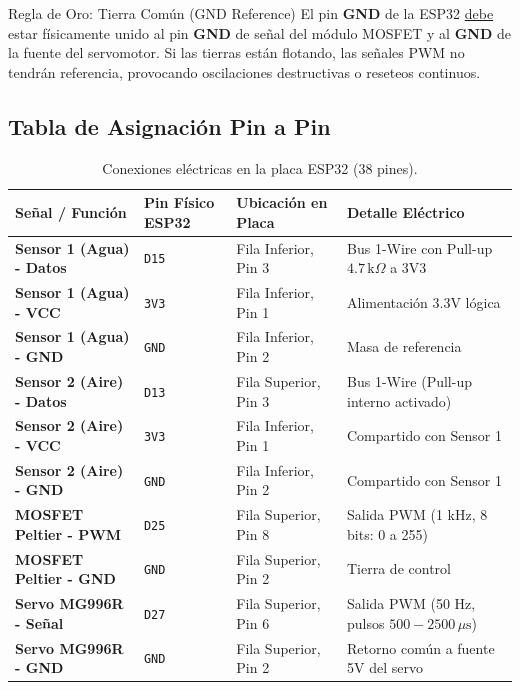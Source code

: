 \documentclass[11pt,letterpaper]{article}
\begin{document}
\begin{alertaBox}{Regla de Oro: Tierra Común (GND Reference)}
El pin \textbf{GND} de la ESP32 \underline{debe} estar físicamente unido al pin \textbf{GND} de señal del módulo MOSFET y al \textbf{GND} de la fuente del servomotor. Si las tierras están flotando, las señales PWM no tendrán referencia, provocando oscilaciones destructivas o reseteos continuos.
\end{alertaBox}

\subsection{Tabla de Asignación Pin a Pin}

\begin{table}[h!]
\centering
\caption{Conexiones eléctricas en la placa ESP32 (38 pines).}
\label{tab:conexiones}
\begin{tabular}{llll}
\toprule
\textbf{Señal / Función} & \textbf{Pin Físico ESP32} & \textbf{Ubicación en Placa} & \textbf{Detalle Eléctrico} \\
\midrule
\textbf{Sensor 1 (Agua) - Datos} & \texttt{D15} & Fila Inferior, Pin 3 & Bus 1-Wire con Pull-up $4.7\,\text{k}\Omega$ a 3V3 \\
\textbf{Sensor 1 (Agua) - VCC} & \texttt{3V3} & Fila Inferior, Pin 1 & Alimentación 3.3V lógica \\
\textbf{Sensor 1 (Agua) - GND} & \texttt{GND} & Fila Inferior, Pin 2 & Masa de referencia \\
\midrule
\textbf{Sensor 2 (Aire) - Datos} & \texttt{D13} & Fila Superior, Pin 3 & Bus 1-Wire (Pull-up interno activado) \\
\textbf{Sensor 2 (Aire) - VCC} & \texttt{3V3} & Fila Inferior, Pin 1 & Compartido con Sensor 1 \\
\textbf{Sensor 2 (Aire) - GND} & \texttt{GND} & Fila Inferior, Pin 2 & Compartido con Sensor 1 \\
\midrule
\textbf{MOSFET Peltier - PWM} & \texttt{D25} & Fila Superior, Pin 8 & Salida PWM (1 kHz, 8 bits: 0 a 255) \\
\textbf{MOSFET Peltier - GND} & \texttt{GND} & Fila Superior, Pin 2 & Tierra de control \\
\midrule
\textbf{Servo MG996R - Señal} & \texttt{D27} & Fila Superior, Pin 6 & Salida PWM (50 Hz, pulsos $500 - 2500\,\mu\text{s}$) \\
\textbf{Servo MG996R - GND} & \texttt{GND} & Fila Superior, Pin 2 & Retorno común a fuente 5V del servo \\
\bottomrule
\end{tabular}
\end{table}
\end{document}
